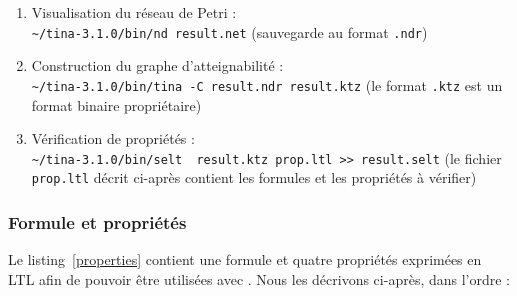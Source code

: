 \begin{enumerate}
  \item Visualisation du réseau de Petri :\\ \verb+~/tina-3.1.0/bin/nd result.net+
  (sauvegarde au format \texttt{.ndr})

  \item Construction du graphe d'atteignabilité :\\ \verb+~/tina-3.1.0/bin/tina -C result.ndr result.ktz+ (le format \texttt{.ktz} est un format binaire
  propriétaire)

\item Vérification de propriétés :\\ \verb+~/tina-3.1.0/bin/selt  result.ktz prop.ltl >> result.selt+ (le fichier \texttt{prop.ltl} décrit ci-après contient les formules et les propriétés à vérifier)
\end{enumerate}


\subsubsection{Formule et propriétés}




Le listing~\ref{properties} contient une formule et quatre propriétés exprimées
en LTL afin de pouvoir être utilisées avec {\tina}. Nous les  décrivons
ci-après, dans l'ordre :

